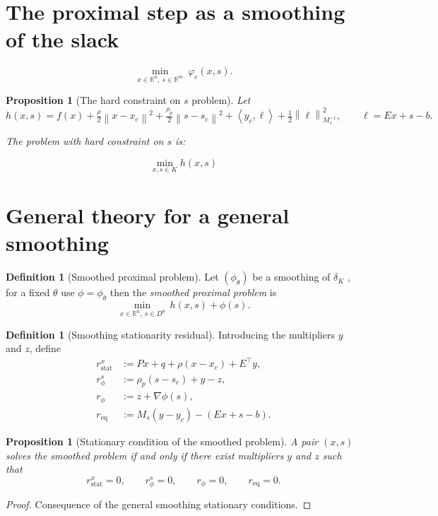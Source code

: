 \documentclass[a4paper,11pt]{book}
\theoremstyle{plain}
\newtheorem{proposition}[theorem]{Proposition}
\theoremstyle{definition}
\newtheorem{definition}[theorem]{Definition}
\theoremstyle{remark}
\numberwithin{equation}{chapter}
\numberwithin{algorithm}{chapter}
\newcommand{\R}{\mathbb{R}}
\newcommand{\norm}[1]{\left\|#1\right\|}
\newcommand{\inner}[2]{\left\langle #1, #2 \right\rangle}
\begin{document}
	\section{The proximal step as a smoothing of the slack}
	
	\begin{equation}
		\min_{x\in\R^n,\ s\in\R^m}\ \varphi_c(x,s) .
	\end{equation}
	
	\begin{proposition}[The hard constraint on $s$ problem]
		Let
		\begin{equation}
			h(x,s)=f(x)+\tfrac{\rho}{2}\norm{x-x_c}^2
			+\tfrac{\rho_p}{2}\norm{s-s_c}^2
			+\inner{y_c}{\ell}+\tfrac12\norm{\ell}^2_{M_s^{-1}},
			\qquad \ell=Ex+s-b .
		\end{equation}
		
		The problem with hard constraint on $s$ is: 
		
		$$ \min_{x, s\in K} h(x,s)$$
		
		
		
	\end{proposition}
	
	
	
	\section{General theory for a general smoothing}
	
	\begin{definition}[Smoothed proximal problem]
		Let
		$(\phi_{\theta})$ be a smoothing of $\delta_K$ , for a fixed $\theta$ use  $\phi = \phi_{\theta}$ then the \emph{smoothed proximal problem}  is
		\begin{equation}
			\min_{x\in\R^n,\ s\in D^\theta}\ h(x,s)+\phi(s) .
		\end{equation}
	\end{definition}
	
	\begin{definition}[Smoothing stationarity residual]
		Introducing the multipliers $y$ and $z$, define
		\begin{align*}
			r_{\mathrm{stat}}^x
			&:= Px+q+\rho(x-x_c)+E^{\top}y, \\
			r_\phi^s
			&:= \rho_p (s-s_c)+y-z, \\
			r_\phi
			&:= z+\nabla\phi(s), \\
			r_{\mathrm{eq}}
			&:= M_s(y-y_c)-(Ex+s-b).
		\end{align*}
	\end{definition}
	\begin{proposition}[Stationary condition of the smoothed problem]
		A pair $(x,s)$ solves the smoothed problem if and only if
		there exist multipliers $y$ and $z$ such that
		\[
		r_{\mathrm{stat}}^x=0,
		\qquad
		r_\phi^s=0,
		\qquad
		r_\phi=0,
		\qquad
		r_{\mathrm{eq}}=0.
		\]
	\end{proposition}
	\begin{proof}
		Consequence of the general smoothing stationary conditions.
	\end{proof}
	
\end{document}

